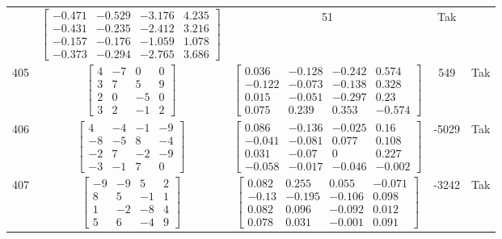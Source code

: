 \documentclass[a4paper,12pt]{article}
\begin{document}
\begin{tabular}{c c c c c}
&
$\begin{bmatrix} -0.471 & -0.529 & -3.176 & 4.235 \\ -0.431 & -0.235 & -2.412 & 3.216 \\ -0.157 & -0.176 & -1.059 & 1.078 \\ -0.373 & -0.294 & -2.765 & 3.686 \end{bmatrix}$
&
51
&
Tak
\\
405
&
$\begin{bmatrix} 4 & -7 & 0 & 0 \\ 3 & 7 & 5 & 9 \\ 2 & 0 & -5 & 0 \\ 3 & 2 & -1 & 2 \end{bmatrix}$
&
$\begin{bmatrix} 0.036 & -0.128 & -0.242 & 0.574 \\ -0.122 & -0.073 & -0.138 & 0.328 \\ 0.015 & -0.051 & -0.297 & 0.23 \\ 0.075 & 0.239 & 0.353 & -0.574 \end{bmatrix}$
&
549
&
Tak
\\
406
&
$\begin{bmatrix} 4 & -4 & -1 & -9 \\ -8 & -5 & 8 & -4 \\ -2 & 7 & -2 & -9 \\ -3 & -1 & 7 & 0 \end{bmatrix}$
&
$\begin{bmatrix} 0.086 & -0.136 & -0.025 & 0.16 \\ -0.041 & -0.081 & 0.077 & 0.108 \\ 0.031 & -0.07 & 0 & 0.227 \\ -0.058 & -0.017 & -0.046 & -0.002 \end{bmatrix}$
&
-5029
&
Tak
\\
407
&
$\begin{bmatrix} -9 & -9 & 5 & 2 \\ 8 & 5 & -1 & 1 \\ 1 & -2 & -8 & 4 \\ 5 & 6 & -4 & 9 \end{bmatrix}$
&
$\begin{bmatrix} 0.082 & 0.255 & 0.055 & -0.071 \\ -0.13 & -0.195 & -0.106 & 0.098 \\ 0.082 & 0.096 & -0.092 & 0.012 \\ 0.078 & 0.031 & -0.001 & 0.091 \end{bmatrix}$
&
-3242
&
Tak
\\

\end{tabular}
\end{document}
